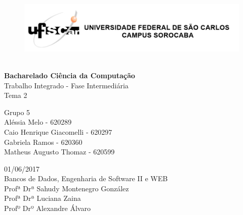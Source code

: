 \documentclass[
	12pt,				%
	oneside,			%
	a4paper,			%
	brazil				%
	]{abntex2}
\begin{document}

\frenchspacing 







\begin{center}

\begin{figure}[!htb]
\includegraphics[width=1.1\textwidth]{USFCAR_-_logo.jpg}\

\end{figure}


\vspace{80pt}
\LARGE{\textbf{Bacharelado Ciência da Computação}}\\
\LARGE{Trabalho Integrado - Fase Intermediária}\\
\LARGE{ Tema 2}

\vspace{50pt}
\textbf{\Huge{}}

\end{center}
	
\begin{flushleft}
		
\begin{center}
{\Large 	Grupo 5\\
			 Aléssia Melo - 620289\\
			 Caio Henrique Giacomelli - 620297\\
  			 Gabriela Ramos - 620360\\
  			 Matheus Augusto Thomaz - 620599\\}
\end{center}
        
\vspace{70pt}

 \begin{center}

{\large { 01/06/2017 \\Bancos de Dados, Engenharia de Software II e WEB } \\
Profª Drª Sahudy Montenegro González\\
Profª Drª Luciana Zaina \\
Profº Drº Alexandre Álvaro} 
                    
\end{center}
        
\end{flushleft}	
  
\end{document}
